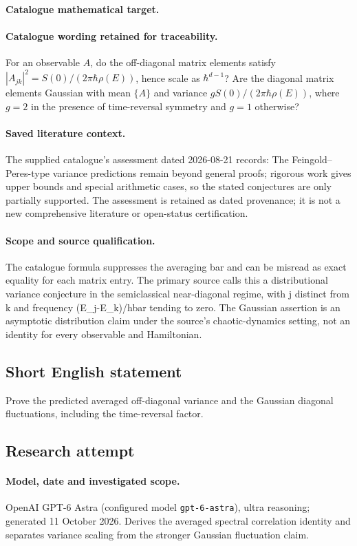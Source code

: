 \documentclass[11pt]{article}
\begin{document}
\paragraph{Catalogue mathematical target.}
\paragraph{Catalogue wording retained for traceability.}
For an observable $A$, do the off-diagonal matrix elements satisfy $|A_{jk}|^2=S(0)/(2\pi\hbar\rho(E))$, hence scale as $\hbar^{d-1}$? Are the diagonal matrix elements Gaussian with mean $\{A\}$ and variance $gS(0)/(2\pi\hbar\rho(E))$, where $g=2$ in the presence of time-reversal symmetry and $g=1$ otherwise?

\paragraph{Saved literature context.} The supplied catalogue's assessment dated 2026-08-21 records: The Feingold--Peres-type variance predictions remain beyond general proofs; rigorous work gives upper bounds and special arithmetic cases, so the stated conjectures are only partially supported. The assessment is retained as dated provenance; it is not a new comprehensive literature or open-status certification.
\paragraph{Scope and source qualification.}The catalogue formula suppresses the averaging bar and can be misread as exact equality for each matrix entry. The primary source calls this a distributional variance conjecture in the semiclassical near-diagonal regime, with j distinct from k and frequency (E_j-E_k)/hbar tending to zero. The Gaussian assertion is an asymptotic distribution claim under the source's chaotic-dynamics setting, not an identity for every observable and Hamiltonian.
\subsection{Short English statement}
Prove the predicted averaged off-diagonal variance and the Gaussian diagonal fluctuations, including the time-reversal factor.
\subsection{Research attempt}
\paragraph{Model, date and investigated scope.}
OpenAI GPT-6 Astra (configured model \texttt{gpt-6-astra}), ultra reasoning; generated 11 October 2026. Derives the averaged spectral correlation identity and separates variance scaling from the stronger Gaussian fluctuation claim.
\end{document}
